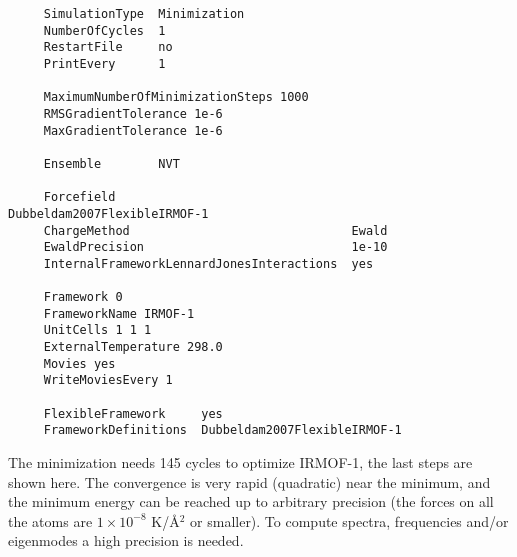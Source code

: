 \begin{tiny}
\begin{verbatim}
     SimulationType  Minimization
     NumberOfCycles  1
     RestartFile     no
     PrintEvery      1

     MaximumNumberOfMinimizationSteps 1000
     RMSGradientTolerance 1e-6
     MaxGradientTolerance 1e-6

     Ensemble        NVT

     Forcefield                                 Dubbeldam2007FlexibleIRMOF-1
     ChargeMethod                               Ewald
     EwaldPrecision                             1e-10
     InternalFrameworkLennardJonesInteractions  yes

     Framework 0
     FrameworkName IRMOF-1
     UnitCells 1 1 1
     ExternalTemperature 298.0
     Movies yes
     WriteMoviesEvery 1

     FlexibleFramework     yes
     FrameworkDefinitions  Dubbeldam2007FlexibleIRMOF-1
\end{verbatim}
\end{tiny}
The minimization needs 145 cycles to optimize IRMOF-1, the last steps are shown here. The convergence is very rapid (quadratic) near the minimum,
and the minimum energy can be reached up to arbitrary precision (the forces on all the atoms are $1\times10^{-8}$ K/\AA$^2$
or smaller). To compute spectra, frequencies and/or eigenmodes a high precision is needed.
